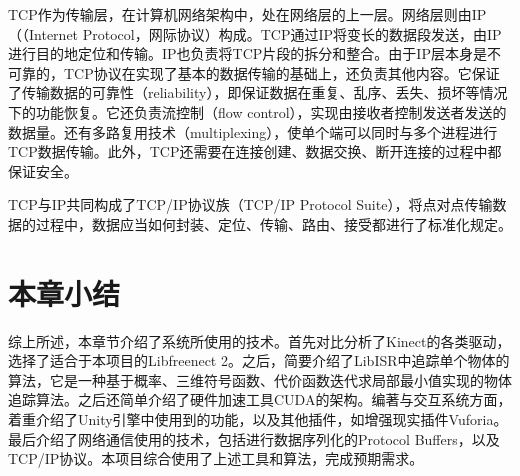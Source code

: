 	TCP作为传输层，在计算机网络架构中，处在网络层的上一层。网络层则由IP（（Internet Protocol，网际协议）构成。TCP通过IP将变长的数据段发送，由IP进行目的地定位和传输。IP也负责将TCP片段的拆分和整合。由于IP层本身是不可靠的，TCP协议在实现了基本的数据传输的基础上，还负责其他内容。它保证了传输数据的可靠性（reliability），即保证数据在重复、乱序、丢失、损坏等情况下的功能恢复。它还负责流控制（flow control），实现由接收者控制发送者发送的数据量。还有多路复用技术（multiplexing），使单个端可以同时与多个进程进行TCP数据传输。此外，TCP还需要在连接创建、数据交换、断开连接的过程中都保证安全。
	
	TCP与IP共同构成了TCP/IP协议族（TCP/IP Protocol Suite），将点对点传输数据的过程中，数据应当如何封装、定位、传输、路由、接受都进行了标准化规定。

\section{本章小结}
综上所述，本章节介绍了系统所使用的技术。首先对比分析了Kinect的各类驱动，选择了适合于本项目的Libfreenect 2。之后，简要介绍了LibISR中追踪单个物体的算法，它是一种基于概率、三维符号函数、代价函数迭代求局部最小值实现的物体追踪算法。之后还简单介绍了硬件加速工具CUDA的架构。编著与交互系统方面，着重介绍了Unity引擎中使用到的功能，以及其他插件，如增强现实插件Vuforia。最后介绍了网络通信使用的技术，包括进行数据序列化的Protocol Buffers，以及TCP/IP协议。本项目综合使用了上述工具和算法，完成预期需求。